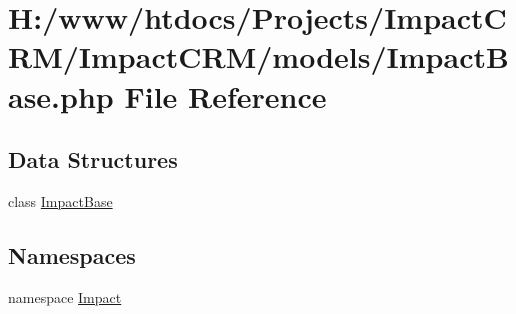 \hypertarget{ImpactBase_8php}{
\section{H:/www/htdocs/Projects/ImpactCRM/ImpactCRM/models/ImpactBase.php File Reference}
\label{ImpactBase_8php}
}
\subsection*{Data Structures}
\begin{DoxyCompactItemize}
\item 
class \hyperlink{classImpactBase}{ImpactBase}
\end{DoxyCompactItemize}
\subsection*{Namespaces}
\begin{DoxyCompactItemize}
\item 
namespace \hyperlink{namespaceImpact}{Impact}
\end{DoxyCompactItemize}
